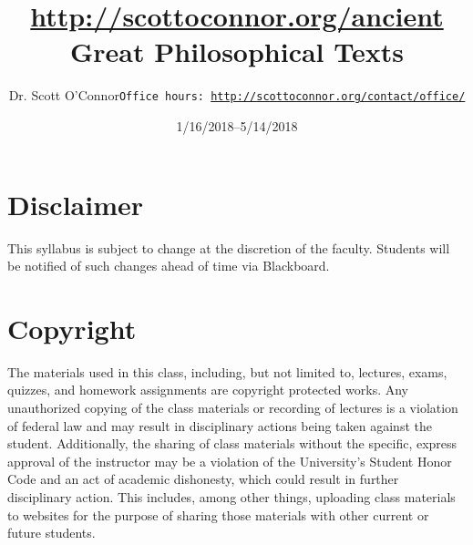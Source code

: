 \documentclass[article,oneside]{memoir}
\def\myauthor{Author}
\def\mytitle{Title}
\def\mycopyright{\myauthor}
\def\myweb{\href{http://scottoconnor.org/ancient}{http://scottoconnor.org/ancient}}
\def\myauthor{Dr. Scott O'Connor}
\def\mytitle{{\normalsize \myweb \newline} \HUGE Great Philosophical Texts}
\begin{document}
\setsansfont[Mapping=tex-text]{Myriad Pro} 
\setmonofont[Mapping=tex-text,Scale=0.8]{Georgia} 

\def\ind{\hangindent=1 true cm\hangafter=1 \noindent}
\def\labelitemi{$\cdot$}


\title{\LARGE \mytitle}     
\author{\Large\myauthor \newline \footnotesize\texttt{\noindent Office hours: \href{http://scottoconnor.org/contact/office/}{http://scottoconnor.org/contact/office/}}}
\date{1/16/2018--5/14/2018}


\maketitle




%
%


\section{Disclaimer}
 This syllabus is subject to change at the discretion of the faculty. Students will be notified of such changes ahead of time via Blackboard. 

\section{Copyright}
The materials used in this class, including, but not limited to, lectures, exams, quizzes, and homework assignments are copyright protected works.  Any unauthorized copying of the class materials or recording of lectures is a violation of federal law and may result in disciplinary actions being taken against the student.  Additionally, the sharing of class materials without the specific, express approval of the instructor may be a violation of the University's Student Honor Code and an act of academic dishonesty, which could result in further disciplinary action.  This includes, among other things, uploading class materials to websites for the purpose of sharing those materials with other current or future students. 
\end{document}
